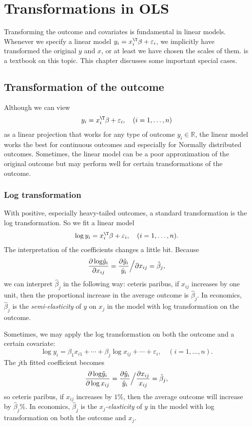  
\chapter{Transformations in OLS}
 
Transforming the outcome and covariates is fundamental in linear models. Whenever we specify a linear model $y_i = x_i^{\T} \beta + \varepsilon_i$, we implicitly have transformed the original $y$ and $x$, or at least we have chosen the scales of them. 
\citet{carroll1988transformation} is a textbook on this topic. 
This chapter discusses some important special cases. 


\section{Transformation of the outcome}

Although we can view
\[
y_{i}=x_{i}^{\T}\beta+\varepsilon_{i},\quad(i=1,\ldots,n)
\]
as a linear projection that works for any type of outcome $y_{i}\in\mathbb{R}$,
the linear model works the best for continuous outcomes and especially
for Normally distributed outcomes. Sometimes, the linear model can be a poor approximation of the original outcome but may perform well for certain transformations of the outcome. 

\subsection{Log transformation}

With positive, especially heavy-tailed outcomes, a standard transformation
is the log transformation. So we fit a linear model
\[
\log y_{i}=x_{i}^{\T}\beta+\varepsilon_{i},\quad(i=1,\ldots,n).
\]
The interpretation of the coefficients changes a little bit. Because
\[
\frac{\text{\ensuremath{\partial\log}}\hat{y}_{i}}{\partial x_{ij}}=\frac{\partial\hat{y}_{i}}{\hat{y}_{i}}\Big/\partial x_{ij}=\hat{\beta}_{j},
\]
we can interpret $\hat{\beta}_{j}$ in the following way: ceteris
paribus, if $x_{ij}$ increases by one unit, then the proportional
increase in the average outcome is $\hat{\beta}_{j}$. In economics, $\hat{\beta}_{j}$ is the {\it semi-elasticity} of $y$ on $x_j$ in the model with log transformation on the outcome. 


Sometimes, we may apply the log transformation on both the outcome and a certain covariate:
$$
\log y_i = \beta_1 x_{i1}  +\cdots + \beta_j \log x_{ij} + \cdots + \varepsilon_i,\quad(i=1,\ldots,n).
$$
The $j$th fitted coefficient becomes
$$
\frac{\text{\ensuremath{\partial\log}}\hat{y}_{i}}{\partial \log x_{ij}} 
= \frac{\partial\hat{y}_{i}}{\hat{y}_{i}}\Big/ \frac{\partial x_{ij}}{x_{ij}}=\hat{\beta}_{j},
$$
so ceteris
paribus, if $x_{ij}$ increases by $1\%$, then   the average outcome will increase by $\hat{\beta}_{j} \%$. In economics, $\hat{\beta}_{j}$ is the {\it $x_j$-elasticity} of $y$ in the model with log transformation on both the outcome and $x_{j}$. 


